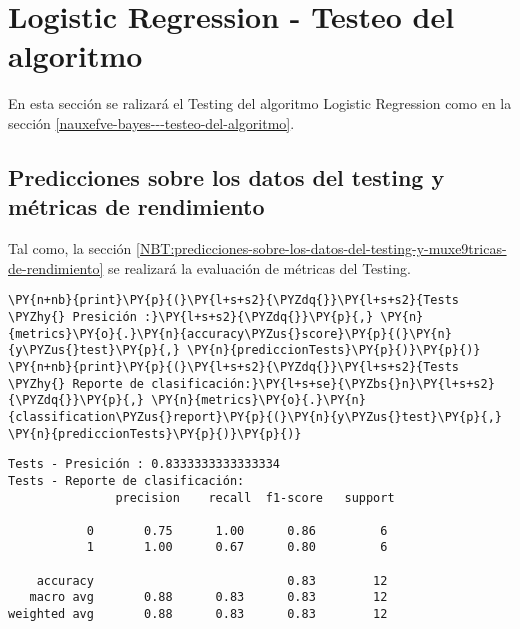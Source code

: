     \hypertarget{logistic-regression---testeo-del-algoritmo}{%
\section{Logistic Regression - Testeo del algoritmo}\label{logistic-regression---testeo-del-algoritmo}}

	En esta sección se ralizará el Testing del algoritmo Logistic Regression como en la sección \ref{nauxefve-bayes---testeo-del-algoritmo}.

    \hypertarget{predicciones-sobre-los-datos-del-testing-y-muxe9tricas-de-rendimiento}{%
\subsection{Predicciones sobre los datos del testing y métricas de rendimiento}\label{predicciones-sobre-los-datos-del-testing-y-muxe9tricas-de-rendimiento}}

	Tal como, la sección \ref{NBT:predicciones-sobre-los-datos-del-testing-y-muxe9tricas-de-rendimiento} se realizará la evaluación de métricas del Testing.

    \begin{tcolorbox}[breakable, size=fbox, boxrule=1pt, pad at break*=1mm,colback=cellbackground, colframe=cellborder]
\begin{Verbatim}[commandchars=\\\{\}]
\PY{n+nb}{print}\PY{p}{(}\PY{l+s+s2}{\PYZdq{}}\PY{l+s+s2}{Tests \PYZhy{} Presición :}\PY{l+s+s2}{\PYZdq{}}\PY{p}{,} \PY{n}{metrics}\PY{o}{.}\PY{n}{accuracy\PYZus{}score}\PY{p}{(}\PY{n}{y\PYZus{}test}\PY{p}{,} \PY{n}{prediccionTests}\PY{p}{)}\PY{p}{)}
\PY{n+nb}{print}\PY{p}{(}\PY{l+s+s2}{\PYZdq{}}\PY{l+s+s2}{Tests \PYZhy{} Reporte de clasificación:}\PY{l+s+se}{\PYZbs{}n}\PY{l+s+s2}{\PYZdq{}}\PY{p}{,} \PY{n}{metrics}\PY{o}{.}\PY{n}{classification\PYZus{}report}\PY{p}{(}\PY{n}{y\PYZus{}test}\PY{p}{,} \PY{n}{prediccionTests}\PY{p}{)}\PY{p}{)}
\end{Verbatim}
\end{tcolorbox}

    \begin{Verbatim}[commandchars=\\\{\}]
Tests - Presición : 0.8333333333333334
Tests - Reporte de clasificación:
               precision    recall  f1-score   support

           0       0.75      1.00      0.86         6
           1       1.00      0.67      0.80         6

    accuracy                           0.83        12
   macro avg       0.88      0.83      0.83        12
weighted avg       0.88      0.83      0.83        12

    \end{Verbatim}
    
